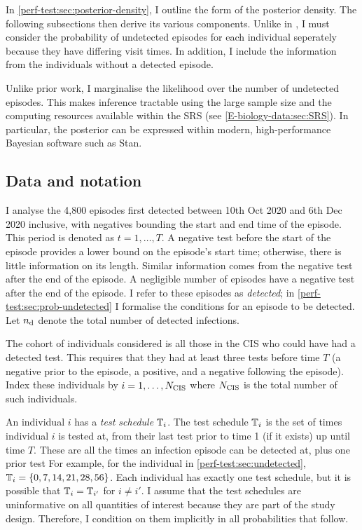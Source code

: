 \documentclass[thesis.tex]{subfiles}
\begin{document}
In \cref{perf-test:sec:posterior-density}, I outline the form of the posterior density.
The following subsections then derive its various components.
Unlike in \textcite{heiseyModelling}, I must consider the probability of undetected episodes for each individual seperately because they have differing visit times.
In addition, I include the information from the individuals without a detected episode.

Unlike prior work, I marginalise the likelihood over the number of undetected episodes.
This makes inference tractable using the large sample size and the computing resources available within the SRS (see \cref{E-biology-data:sec:SRS}).
In particular, the posterior can be expressed within modern, high-performance Bayesian software such as Stan.

\subsection{Data and notation} \label{perf-test:sec:data-notation}

I analyse the 4,800 episodes first detected between 10th Oct 2020 and 6th Dec 2020 inclusive, with negatives bounding the start and end time of the episode.
This period is denoted as $t = 1, \dots, T$.
A negative test before the start of the episode provides a lower bound on the episode's start time; otherwise, there is little information on its length.
Similar information comes from the negative test after the end of the episode.
A negligible number of episodes have a negative test after the end of the episode.
I refer to these episodes as \emph{detected}; in \cref{perf-test:sec:prob-undetected} I formalise the conditions for an episode to be detected.
Let $n_\text{d}$ denote the total number of detected infections.

The cohort of individuals considered is all those in the CIS who could have had a detected test.
This requires that they had at least three tests before time $T$ (a negative prior to the episode, a positive, and a negative following the episode).
Index these individuals by $i = 1, \dots, N_\text{CIS}$ where $N_\text{CIS}$ is the total number of such individuals.

An individual $i$ has a \emph{test schedule} $\mathbb{T}_i$.
The test schedule $\mathbb{T}_i$ is the set of times individual $i$ is tested at, from their last test prior to time 1 (if it exists) up until time $T$.
These are all the times an infection episode can be detected at, plus one prior test
For example, for the individual in \cref{perf-test:sec:undetected}, $\mathbb{T}_i = \{ 0, 7, 14, 21, 28, 56 \}$.
Each individual has exactly one test schedule, but it is possible that $\mathbb{T}_i = \mathbb{T}_{i'}$ for $i \neq i'$.
I assume that the test schedules are uninformative on all quantities of interest because they are part of the study design.
Therefore, I condition on them implicitly in all probabilities that follow.
\end{document}
